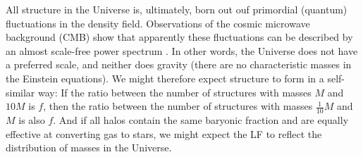 \documentclass[useAMS,usenatbib,bibyear]{aa}
\begin{document}
All structure in the Universe is, ultimately, born out ouf primordial (quantum) fluctuations in the density field.
Observations of the cosmic microwave background (CMB) show that apparently these fluctuations can be described by an almost scale-free power spectrum \citep{PlanckCollaboration2018a}.
In other words, the Universe does not have a preferred scale, and neither does gravity (there are no characteristic masses in the Einstein equations).
We might therefore expect structure to form in a self-similar way: If the ratio between the number of structures with masses $M$ and $10M$ is $f$, then the ratio between the number of structures with masses $\frac{1}{10}M$ and $M$ is also $f$.
And if all halos contain the same baryonic fraction and are equally effective at converting gas to stars, we might expect the LF to reflect the distribution of masses in the Universe.
\end{document}
